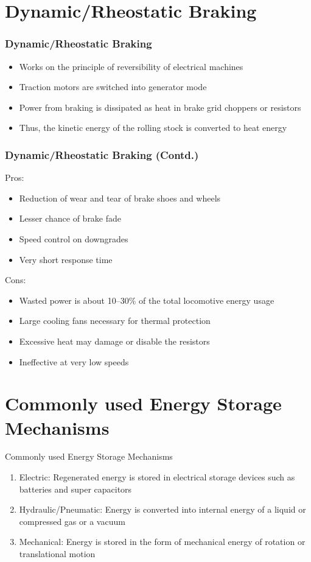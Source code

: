\documentclass[aspectratio=169]{beamer}
\begin{document}
\section{Dynamic/Rheostatic Braking}

\begin{frame}
	\frametitle{Dynamic/Rheostatic Braking}
	\begin{itemize}
		\item Works on the principle of reversibility of electrical machines
		\item Traction motors are switched into generator mode
		\item Power from braking is dissipated as heat in brake grid choppers or
		resistors
		\item Thus, the kinetic energy of the rolling stock is converted to heat energy

		
	\end{itemize}
\end{frame}


\begin{frame}
	\frametitle{Dynamic/Rheostatic Braking (Contd.)}
	Pros:
	\begin{itemize}
		\item Reduction of wear and tear of brake shoes and wheels
		\item Lesser chance of brake fade
		\item Speed control on downgrades
		\item Very short response time
		
	\end{itemize}
Cons:
	\begin{itemize}
		\item Wasted power is about 10–30\% of the total
		locomotive energy usage \cite{p4}
	\item Large cooling fans necessary for thermal protection
	\item Excessive heat may damage or disable the resistors
	\item Ineffective at very low speeds
	
\end{itemize}
\end{frame}


\section{Commonly used Energy Storage Mechanisms}
\begin{frame}{Commonly used Energy Storage Mechanisms}
	
	
	\begin{enumerate}
		\item Electric: Regenerated energy is stored in electrical storage devices
		such as batteries and super capacitors
		\item Hydraulic/Pneumatic: Energy is converted into internal energy of a
		liquid or compressed gas or a vacuum
		\item Mechanical: Energy is stored in the form of mechanical energy of
		rotation or translational motion
	\end{enumerate}
	
	
\end{frame}
\end{document}
